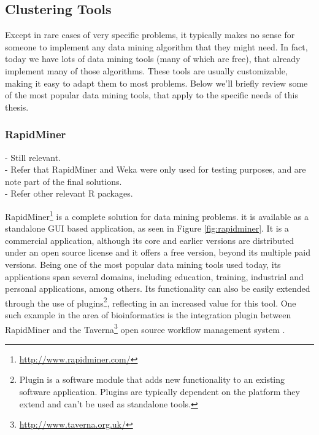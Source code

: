 
\subsection{Clustering Tools}\label{sec:clustertool}

Except in rare cases of very specific problems, it typically makes no sense for
someone to implement any data mining algorithm that they might need. In fact,
today we have lots of data mining tools (many of which are free), that already
implement many of those algorithms. These tools are usually customizable, making
it easy to adapt them to most problems. Below we'll briefly review some of the
most popular data mining tools, that apply to the specific needs of this thesis.

\subsubsection*{RapidMiner}

\begin{Notes}
- Still relevant.\\
- Refer that RapidMiner and Weka were only used for testing purposes, and are
note part of the final solutions.\\
- Refer other relevant R packages.\\
\end{Notes}

RapidMiner\footnote{\url{http://www.rapidminer.com/}} is a complete solution for
data mining problems. it is available as a standalone GUI based application, as
seen in Figure \ref{fig:rapidminer}. It is a commercial application, although
its core and earlier versions are distributed under an open source license and
it offers a free version, beyond its multiple paid versions. Being one of the
most popular data mining tools used today, its applications span several
domains, including education, training, industrial and personal applications,
among others. Its functionality can also be easily extended through the use of
plugins\footnote{Plugin is a software module that adds new functionality to an
existing software application. Plugins are typically dependent on the platform
they extend and can't be used as standalone tools.}, reflecting in an increased
value for this tool. One such example in the area of bioinformatics is the
integration plugin between RapidMiner and the
Taverna\footnote{\url{http://www.taverna.org.uk/}} open source workflow
management system \cite{Jupp2011}.

